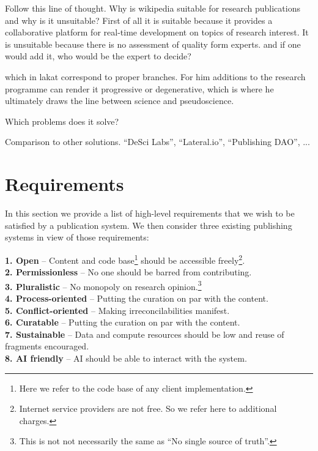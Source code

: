 \documentclass[14pt]{article}
\begin{document}
Follow this line of thought. Why is wikipedia suitable for research publications and why is it unsuitable? First of all it is suitable because it provides a collaborative platform for real-time development on topics of research interest. It is unsuitable because there is no assessment of quality form experts. and if one would add it, who would be the expert to decide?

which in lakat correspond to proper branches. For him additions to the research programme can render it progressive or degenerative, which is where he ultimately draws the line between science and pseudoscience. 

Which problems does it solve?

Comparison to other solutions. 
``DeSci Labs'', ``Lateral.io'', ``Publishing DAO'', ...

\section{Requirements}

In this section we provide a list of high-level requirements that we wish to be satisfied by a publication system. We then consider three existing publishing systems in view of those requirements:

\indent \textbf{1. Open} -- 
 Content and code base\footnote{Here we refer to the code base of any client implementation.} should be accessible freely\footnote{Internet service providers are not free. So we refer here to additional charges.}.\\
\indent\textbf{2. Permissionless} --
 No one should be barred from contributing.\\
\indent\textbf{3. Pluralistic} -- No monopoly on research opinion.\footnote{This is not not necessarily the same as ``No single source of truth''.}\\
\indent\textbf{4. Process-oriented} -- Putting the curation on par with the content.\\
\indent\textbf{5. Conflict-oriented} -- Making irreconcilabilities manifest.\\
\indent\textbf{6. Curatable} -- Putting the curation on par with the content.\\
\indent\textbf{7. Sustainable} -- 
 Data and compute resources should be low and reuse of fragments encouraged.\\
\indent\textbf{8. AI friendly} -- AI should be able to interact with the system.\\
\end{document}
